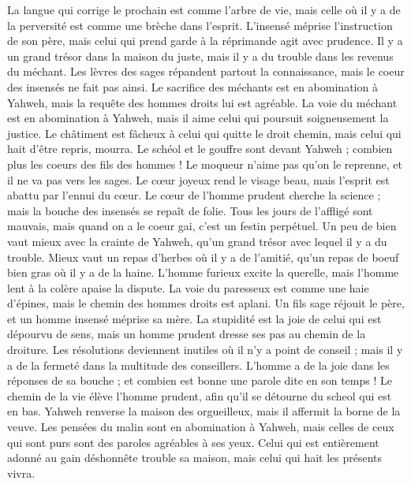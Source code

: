 \begin{multicols}{2}
La langue qui corrige le prochain est comme l'arbre de vie, mais celle où il y a de la perversité est comme une brèche dans l'esprit.
L'insensé méprise l'instruction de son père, mais celui qui prend garde à la réprimande agit avec prudence.
Il y a un grand trésor dans la maison du juste, mais il y a du trouble dans les revenus du méchant.
Les lèvres des sages répandent partout la connaissance, mais le coeur des insensés ne fait pas ainsi.
Le sacrifice des méchants est en abomination à Yahweh, mais la requête des hommes droits lui est agréable.
La voie du méchant est en abomination à Yahweh, mais il aime celui qui poursuit soigneusement la justice.
Le châtiment est fâcheux à celui qui quitte le droit chemin, mais celui qui hait d'être repris, mourra.
Le schéol et le gouffre sont devant Yahweh ; combien plus les coeurs des fils des hommes !
Le moqueur n'aime pas qu'on le reprenne, et il ne va pas vers les sages.
Le cœur joyeux rend le visage beau, mais l'esprit est abattu par l'ennui du cœur.
Le cœur de l'homme prudent cherche la science ; mais la bouche des insensés se repaît de folie.
Tous les jours de l'affligé sont mauvais, mais quand on a le coeur gai, c'est un festin perpétuel.
Un peu de bien vaut mieux avec la crainte de Yahweh, qu'un grand trésor avec lequel il y a du trouble.
Mieux vaut un repas d'herbes où il y a de l'amitié, qu'un repas de boeuf bien gras où il y a de la haine.
L'homme furieux excite la querelle, mais l'homme lent à la colère apaise la dispute.
La voie du paresseux est comme une haie d'épines, mais le chemin des hommes droits est aplani.
Un fils sage réjouit le père, et un homme insensé méprise sa mère.
La stupidité est la joie de celui qui est dépourvu de sens, mais un homme prudent dresse ses pas au chemin de la droiture.
 Les résolutions deviennent inutiles où il n'y a point de conseil ; mais il y a de la fermeté dans la multitude des conseillers.
L'homme a de la joie dans les réponses de sa bouche ; et combien est bonne une parole dite en son temps !
Le chemin de la vie élève l'homme prudent, afin qu'il se détourne du scheol qui est en bas.
Yahweh renverse la maison des orgueilleux, mais il affermit la borne de la veuve.
Les pensées du malin sont en abomination à Yahweh, mais celles de ceux qui sont purs sont des paroles agréables à ses yeux.
Celui qui est entièrement adonné au gain déshonnête trouble sa maison, mais celui qui hait les présents vivra.

\end{multicols}
